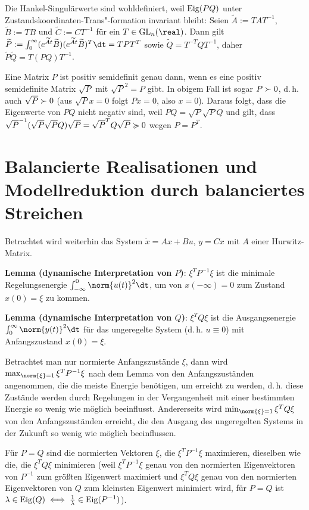Die Hankel-Singulärwerte sind wohldefiniert, weil $\operatorname{Eig}(PQ)$ unter
Zustandskoordinaten-Trans"-formation invariant bleibt:
Seien $\widetilde{A} := TAT^{-1}$, $\widetilde{B} := TB$ und $\widetilde{C} := CT^{-1}$ für
ein $T \in \GL_n(\real)$.
Dann gilt $\widetilde{P} := \int_0^\infty (e^{\widetilde{A} t} \widetilde{B})
(e^{\widetilde{A} t} \widetilde{B})^T \dt
= TPT^T$ sowie $\widetilde{Q} = T^{-T} Q T^{-1}$,
daher $\widetilde{P} \widetilde{Q} = T(PQ)T^{-1}$.

Eine Matrix $P$ ist positiv semidefinit genau dann, wenn es
eine positiv semidefinite Matrix $\sqrt{P}$ mit $\sqrt{P}^2 = P$ gibt.
In obigem Fall ist sogar $P \succ 0$, d.\,h. auch $\sqrt{P} \succ 0$
(aus $\sqrt{P}x = 0$ folgt $Px = 0$, also $x = 0$).
Daraus folgt, dass die Eigenwerte von $PQ$ nicht negativ sind, weil $PQ = \sqrt{P} \sqrt{P} Q$
und gilt, dass $\sqrt{P}^{-1} (\sqrt{P} \sqrt{P} Q) \sqrt{P} = \sqrt{P}^T Q \sqrt{P} \succcurlyeq 0$ wegen
$P = P^T$.

\pagebreak

\section{%
    Balancierte Realisationen und Modellreduktion durch balanciertes Streichen%
}

Betrachtet wird weiterhin das System $\dot{x} = Ax + Bu$, $y = Cx$ mit $A$ einer Hurwitz-Matrix.

\textbf{Lemma (dynamische Interpretation von $P$)}:
$\xi^T P^{-1} \xi$ ist die minimale Regelungsenergie $\int_{-\infty}^0 \norm{u(t)}^2 \dt$,
um von $x(-\infty) = 0$ zum Zustand $x(0) = \xi$ zu kommen.

\textbf{Lemma (dynamische Interpretation von $Q$)}:
$\xi^T Q \xi$ ist die Ausgangsenergie $\int_0^\infty \norm{y(t)}^2 \dt$
für das ungeregelte System (d.\,h. $u \equiv 0$) mit Anfangszustand $x(0) = \xi$.

Betrachtet man nur normierte Anfangszustände $\xi$,
dann wird $\max_{\norm{\xi}=1} \xi^T P^{-1} \xi$ nach dem Lemma von den Anfangszuständen
angenommen, die die meiste Energie benötigen, um erreicht zu werden,
d.\,h. diese Zustände werden durch Regelungen in der Vergangenheit mit einer bestimmten Energie
so wenig wie möglich beeinflusst.
Andererseits wird $\min_{\norm{\xi}=1} \xi^T Q\xi$ von den Anfangszuständen
erreicht, die den Ausgang des ungeregelten Systems in der Zukunft so wenig wie möglich
beeinflussen.

Für $P = Q$ sind die normierten Vektoren $\xi$, die $\xi^T P^{-1} \xi$ maximieren,
dieselben wie die, die $\xi^T Q\xi$ minimieren
(weil $\xi^T P^{-1} \xi$ genau von den normierten Eigenvektoren von $P^{-1}$ zum größten Eigenwert
maximiert und $\xi^T Q\xi$ genau von den normierten Eigenvektoren von $Q$ zum kleinsten
Eigenwert minimiert wird,
für $P = Q$ ist $\lambda \in \operatorname{Eig}(Q) \iff \frac{1}{\lambda} \in \operatorname{Eig}(P^{-1})$).

